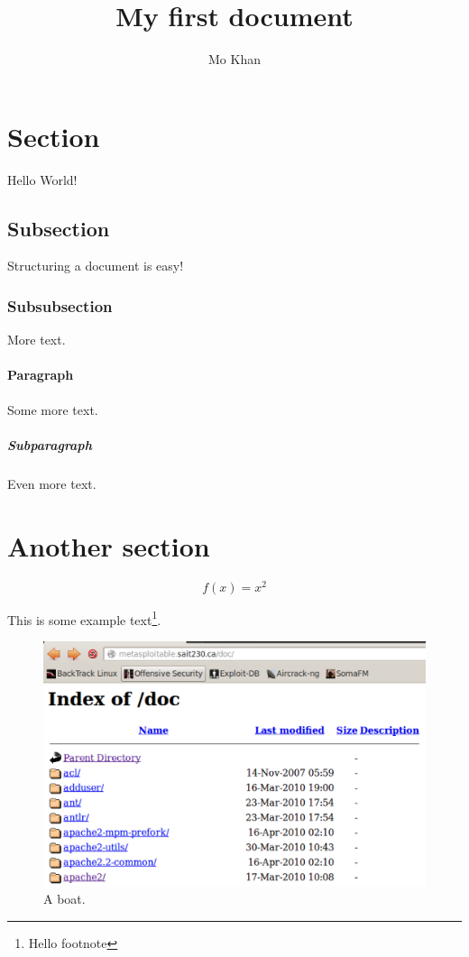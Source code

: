 \documentclass{article}
\title{My first document}
\author{Mo Khan}
\begin{document}
\maketitle
\newpage
\tableofcontents
\newpage
{}

\section{Section}

Hello World!

\subsection{Subsection}

Structuring a document is easy!

\subsubsection{Subsubsection}

More text.

\paragraph{Paragraph}

Some more text.

\subparagraph{Subparagraph}

Even more text.

\newpage
\section{Another section}

\begin{equation*}
	f(x) = x^2
\end{equation*}

This is some example text\footnote{\label{myfootnote}Hello footnote}.

\begin{figure}[h!]
	\includegraphics[width=\linewidth]{images/screenshot.png}
	\caption{A boat.}
	\label{fig:boat1}
\end{figure}
\end{document}
